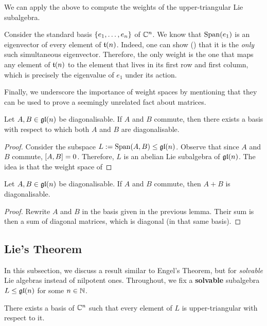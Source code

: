 We can apply the above to compute the weights of the upper-triangular Lie subalgebra.

\begin{boxexample}[$\t{n}$]
    Consider the standard basis $\left\{ e_1, \ldots, e_n \right\}$ of $\mathbb{C}^n$. We know that $\operatorname{Span}\!\left( e_1 \right)$ is an eigenvector of every element of $\t{n}$. Indeed, one can show (\sorry) that it is the \textit{only} such simultaneous eigenvector. Therefore, the only weight is the one that maps any element of $\t{n}$ to the element that lives in its first row and first column, which is precisely the eigenvalue of $e_1$ under its action. \sorry
\end{boxexample}

Finally, we underscore the importance of weight spaces by mentioning that they can be used to prove a seemingly unrelated fact about matrices.

\begin{boxlemma}\label{Ch1:Lemma:SimulDiagOfCommuting}
    Let $A, B \in \mathfrak{gl}\!\left( n \right)$ be diagonalisable. If $A$ and $B$ commute, then there exists a basis with respect to which both $A$ and $B$ are diagonalisable.
\end{boxlemma}
\begin{proof}
    Consider the subspace $L := \operatorname{Span}\!\left( A, B \right) \leq \mathfrak{gl}\!\left( n \right)$. Observe that since $A$ and $B$ commute, $\left[ A, B \right] = 0$. Therefore, $L$ is an abelian Lie subalgebra of $\mathfrak{gl}\!\left( n \right)$. The idea is that the weight space of 
\end{proof}

\begin{boxcorollary}
    Let $A, B \in \mathfrak{gl}\!\left( n \right)$ be diagonalisable. If $A$ and $B$ commute, then $A + B$ is diagonalisable.
\end{boxcorollary}
\begin{proof}
    Rewrite $A$ and $B$ in the basis given in the previous lemma. Their sum is then a sum of diagonal matrices, which is diagonal (in that same basis).
\end{proof}

\subsection{Lie's Theorem}

In this subsection, we discuss a result similar to Engel's Theorem, but for \textit{solvable} Lie algebras instead of nilpotent ones. Throughout, we fix a \textbf{solvable} subalgebra $L \leq \mathfrak{gl}\!\left( n \right)$ for some $n \in \mathbb{N}$.

\begin{boxtheorem}\label{Ch1:Thm:Lie}
    There exists a basis of $\mathbb{C}^n$ such that every element of $L$ is upper-triangular with respect to it.
\end{boxtheorem}

